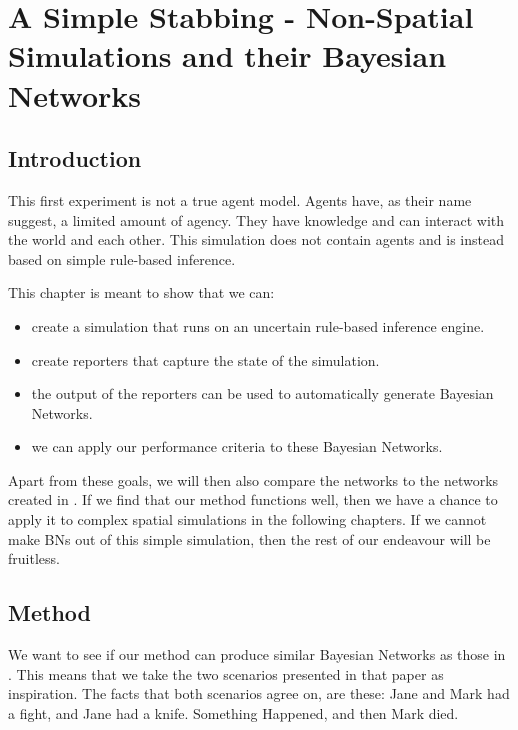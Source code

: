  

\chapter[Simple Non-Spatial Simulations]{A Simple Stabbing - Non-Spatial Simulations and their Bayesian Networks}

\section{Introduction}

This first experiment is not a true agent model. Agents have, as their name suggest, a limited amount of agency. They have knowledge and can interact with the world and each other. This simulation does not contain agents and is instead based on simple rule-based inference.

This chapter is meant to show that we can:
\begin{itemize}
\item create a simulation that runs on an uncertain rule-based inference engine. 
\item create reporters that capture the state of the simulation.
\item the output of the reporters can be used to automatically generate Bayesian Networks.
\item we can apply our performance criteria to these Bayesian Networks.
\end{itemize}

Apart from these goals, we will then also compare the networks to the networks created in \citet{Vlek2015}. If we find that our method functions well, then we have a chance to apply it to complex spatial simulations in the following chapters. If we cannot make BNs out of this simple simulation, then the rest of our endeavour will be fruitless.

\section{Method}
We want to see if our method can produce similar Bayesian Networks as those in \citet{Vlek2015}. This means that we take the two scenarios presented in that paper as inspiration. The facts that both scenarios agree on, are these: Jane and Mark had a fight, and Jane had a knife. Something Happened, and then Mark died. 

